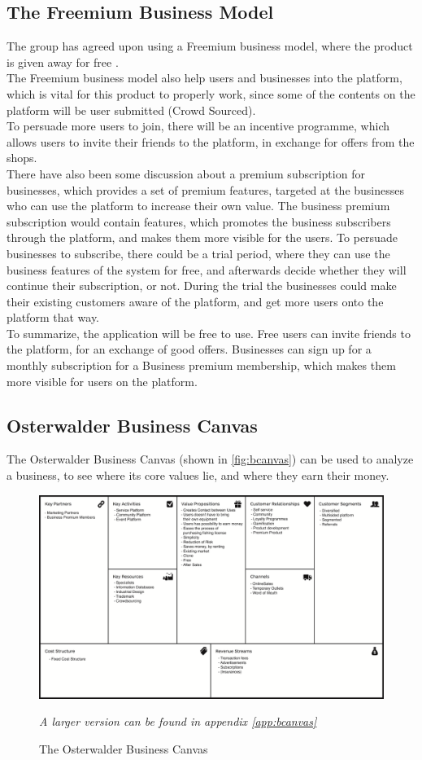 \subsection{The Freemium Business Model}
The group has agreed upon using a Freemium business model, where the product is given away for free \cite{kumar, torres}.\\

The Freemium business model also help users and businesses into the platform, which is vital for this product to properly work, since some of the contents on the platform will be user submitted (Crowd Sourced).\\

To persuade more users to join, there will be an incentive programme, which allows users to invite their friends to the platform, in exchange for offers from the shops.\\


There have also been some discussion about a premium subscription for businesses, which provides a set of premium features, targeted at the businesses who can use the platform to increase their own value.
The business premium subscription would contain features, which promotes the business subscribers through the platform, and makes them more visible for the users.
To persuade businesses to subscribe, there could be a trial period, where they can use the business features of the system for free, and afterwards decide whether they will continue their subscription, or not.
During the trial the businesses could make their existing customers aware of the platform, and get more users onto the platform that way.\\


To summarize, the application will be free to use. 
Free users can invite friends to the platform, for an exchange of good offers.
Businesses can sign up for a monthly subscription for a Business premium membership, which makes them more visible for users on the platform.

\subsection{Osterwalder Business Canvas}
The Osterwalder Business Canvas (shown in \autoref{fig:bcanvas}) can be used to analyze a business, to see where its core values lie, and where they earn their money.


\begin{figure}[H]
  \centering
  \includegraphics[width=.45\textwidth]{images/business_canvas.png}
  \caption{The Osterwalder Business Canvas}
  \label{fig:bcanvas}
  \footnotesize{\textit{A larger version can be found in appendix \ref{app:bcanvas}}}
\end{figure}

